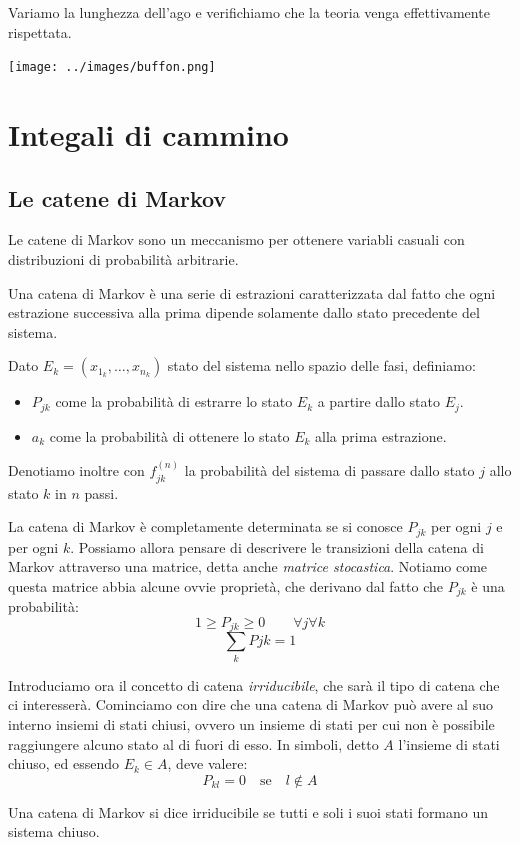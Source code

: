 \documentclass[a4paper,10pt]{article}
\begin{document}
Variamo la lunghezza dell'ago e verifichiamo che la teoria venga effettivamente rispettata.

\texttt{[image: ../images/buffon.png]}

\section{Integali di cammino}
\subsection{Le catene di Markov}

Le catene di Markov sono un meccanismo per ottenere variabli casuali con distribuzioni di probabilità arbitrarie.

Una catena di Markov è una serie di estrazioni caratterizzata dal fatto che ogni estrazione successiva alla prima dipende solamente dallo stato precedente del sistema.

Dato $E_k = (x_{1_k}, \dots, x_{n_k})$ stato del sistema nello spazio delle fasi, definiamo:
\begin{itemize}
 \item $P_{jk}$ come la probabilità di estrarre lo stato $E_k$ a partire dallo stato $E_j$.
 \item $a_k$ come la probabilità di ottenere lo stato $E_k$ alla prima estrazione.
\end{itemize}

Denotiamo inoltre con $f^{(n)}_{jk}$ la probabilità del sistema di passare dallo stato $j$ allo stato $k$ in $n$ passi.

La catena di Markov è completamente determinata se si conosce $P_{jk}$ per ogni $j$ e per ogni $k$. Possiamo allora pensare di descrivere le transizioni della catena di Markov attraverso una matrice, detta anche \emph{matrice stocastica}. Notiamo come questa matrice abbia alcune ovvie proprietà, che derivano dal fatto che $P_{jk}$ è una probabilità:
$$1\geq P_{jk} \geq 0\qquad \forall j \forall k$$
$$\sum_k Pjk = 1$$

Introduciamo ora il concetto di catena \emph{irriducibile}, che sarà il tipo di catena che ci interesserà. Cominciamo con dire che una catena di Markov può avere al suo interno insiemi di stati chiusi, ovvero un insieme di stati per cui non è possibile raggiungere alcuno stato al di fuori di esso. In simboli, detto $A$ l'insieme di stati chiuso, ed essendo $E_k\in A$, deve valere:
$$P_{kl} = 0 \quad\text{se}\quad l\not\in A$$

Una catena di Markov si dice irriducibile se tutti e soli i suoi stati formano un sistema chiuso.
\end{document}

